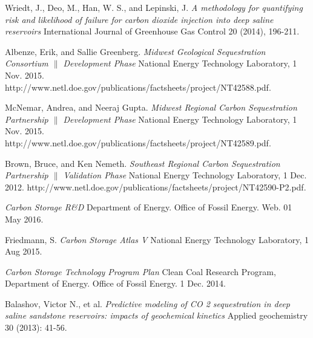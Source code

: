 \documentclass[a4paper, 12pt]{article}
\begin{document}
 
\begin{thebibliography}{9}

Wriedt, J., Deo, M., Han, W. S., and Lepinski, J.
\textit{A methodology for quantifying risk and likelihood of failure for carbon dioxide injection into deep saline reservoirs}
International Journal of Greenhouse Gas Control 20 (2014), 196-211.

Albenze, Erik, and Sallie Greenberg. 
\textit{Midwest Geological Sequestration Consortium $\|$ Development Phase}
National Energy Technology Laboratory, 1 Nov. 2015. http://www.netl.doe.gov/publications/factsheets/project/NT42588.pdf.

McNemar, Andrea, and Neeraj Gupta. 
\textit{Midwest Regional Carbon Sequestration Partnership $\|$ Development Phase}
National Energy Technology Laboratory, 1 Nov. 2015. http://www.netl.doe.gov/publications/factsheets/project/NT42589.pdf.

Brown, Bruce, and Ken Nemeth. 
\textit{Southeast Regional Carbon Sequestration Partnership $\|$ Validation Phase}
National Energy Technology Laboratory, 1 Dec. 2012. http://www.netl.doe.gov/publications/factsheets/project/NT42590-P2.pdf.

\textit{Carbon Storage R\&D} Department of Energy. Office of Fossil Energy. Web. 01 May 2016.

Friedmann, S. 
\textit{Carbon Storage Atlas V} 
National Energy Technology Laboratory, 1 Aug 2015.

\textit{Carbon Storage Technology Program Plan}
Clean Coal Research Program, Department of Energy. Office of Fossil Energy. 1 Dec. 2014.

Balashov, Victor N., et al.
\textit{Predictive modeling of CO 2 sequestration in deep saline sandstone reservoirs: impacts of geochemical kinetics}
Applied geochemistry 30 (2013): 41-56.

\end{thebibliography}
\end{document}
